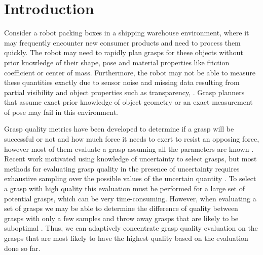 \documentclass[journal,transmag]{IEEEtran}%
\begin{document}
\section{Introduction}



Consider a robot packing boxes in a shipping warehouse environment, where it may frequently encounter new consumer products and need to process them quickly.
The robot may need to rapidly plan grasps for these objects without prior knowledge of their shape, pose and material properties like friction coefficient or center of mass. 
Furthermore, the robot may not be able to measure these quantities exactly due to sensor noise and missing data resulting from partial visibility and object properties such as transparency, .
Grasp planners that assume exact prior knowledge of object geometry or an exact measurement of pose may fail in this environment.

Grasp quality metrics have been developed to determine if a grasp will be successful or not and how much force it needs to exert to resist an opposing force, however most of them evaluate a grasp assuming all the parameters are known \cite{ferrari1992}.
Recent work motivated using knowledge of uncertainty to select grasps, but most methods for evaluating grasp quality in the presence of uncertainty requires exhaustive sampling over the possible values of the uncertain quantity \cite{kim2012physically, weisz2012pose}.
To select a grasp with high quality this evaluation must be performed for a large set of potential grasps, which can be very time-consuming.
However, when evaluating a set of grasps we may be able to determine the difference of quality between grasps with only a few samples and throw away grasps that are likely to be suboptimal \cite{kehoe2012estimating}.
Thus, we can adaptively concentrate grasp quality evaluation on the grasps that are most likely to have the highest quality based on the evaluation done so far.
\end{document}
